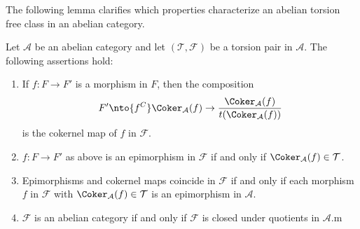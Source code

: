 The following lemma clarifies which properties characterize an abelian torsion free class
in an abelian category.

\begin{lemma}
  Let $\mathcal{A}$ be an abelian category and let $(\mathcal{T},\mathcal{F})$ be a torsion pair in $\mathcal{A}$.
  The following assertions hold:
  \begin{enumerate}
    \item If $f:F\to F'$ is a morphism in $F$, then the composition
    \begin{equation*}
      F'\nto{f^C}\Coker_\mathcal{A}(f)\to\frac{\Coker_\mathcal{A}(f)}{t(\Coker_\mathcal{A}(f))}
    \end{equation*}
    is the cokernel map of $f$ in $\mathcal{F}$.
    \item $f:F\to F'$ as above is an epimorphism in $\mathcal{F}$ if and only if
    $\Coker_\mathcal{A}(f)\in\mathcal{T}$.
    \item Epimorphisms and cokernel maps coincide in $\mathcal{F}$ if and only if
    each morphism $f$ in $\mathcal{F}$ with $\Coker_\mathcal{A}(f)\in\mathcal{T}$ is
    an epimorphism in $\mathcal{A}$.
    \item $\mathcal{F}$ is an abelian category if and only if $\mathcal{F}$ is closed
    under quotients in $\mathcal{A}$.m
  \end{enumerate}
\end{lemma}

